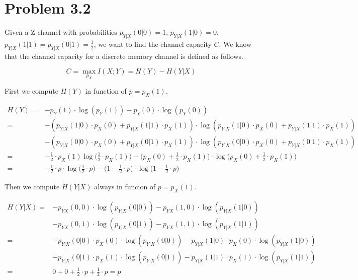 \section{Problem 3.2}

Given a Z channel with probabilities $p_{Y|X}(0|0)=1$, $p_{Y|X}(1|0)=0$, $p_{Y|X}(1|1)=p_{Y|X}(0|1)=\frac{1}{2}$, we want to find the channel capacity $C$. We know that the channel capacity for a discrete memory channel is defined as follows.

\begin{equation}
	C = \max_{p_X} I(X;Y) = H(Y)-H(Y|X)
\end{equation}

First we compute $H(Y)$ in function of $p=p_X(1)$.

\begin{equation}
\begin{aligned}
	H(Y)= & -p_Y(1)\cdot\log(p_Y(1))-p_Y(0)\cdot\log(p_Y(0)) \\
	= & -(p_{Y|X}(1|0) \cdot p_X(0) + p_{Y|X}(1|1) \cdot p_X(1)) \cdot\log(p_{Y|X}(1|0) \cdot p_X(0) + p_{Y|X}(1|1) \cdot p_X(1)) \\ & -(p_{Y|X}(0|0) \cdot p_X(0) + p_{Y|X}(0|1) \cdot p_X(1)) \cdot\log(p_{Y|X}(0|0) \cdot p_X(0) + p_{Y|X}(0|1) \cdot p_X(1)) \\
	= & -\frac{1}{2}\cdot p_X(1)\log\Big(\frac{1}{2}\cdot p_X(1)\Big)-\Big(p_X(0)+\frac{1}{2}\cdot p_X(1)\Big)\cdot \log \Big(p_X(0)+\frac{1}{2}\cdot p_X(1)\Big) \\
	= & -\frac{1}{2}\cdot p \cdot \log\Big(\frac{1}{2}\cdot p\Big)-\Big(1-\frac{1}{2}\cdot p\Big)\cdot \log \Big(1-\frac{1}{2}\cdot p\Big)
\end{aligned}
\end{equation}

Then we compute $H(Y|X)$ always in funcion of $p=p_X(1)$.

\begin{equation}
\begin{aligned}
	H(Y|X) = & -p_{YX}(0,0) \cdot \log (p_{Y|X}(0|0)) -p_{YX}(1,0) \cdot \log (p_{Y|X}(1|0)) \\
	& -p_{YX}(0,1) \cdot \log (p_{Y|X}(0|1)) -p_{YX}(1,1) \cdot \log (p_{Y|X}(1|1)) \\ =
	& -p_{Y|X}(0|0) \cdot p_X(0) \cdot \log (p_{Y|X}(0|0)) -p_{Y|X}(1|0) \cdot p_X(0) \cdot \log (p_{Y|X}(1|0)) \\
	& -p_{Y|X}(0|1) \cdot p_X(1) \cdot \log (p_{Y|X}(0|1)) -p_{Y|X}(1|1) \cdot p_X(1) \cdot \log (p_{Y|X}(1|1)) \\ =	& 0 + 0 + \frac{1}{2} \cdot p + \frac{1}{2} \cdot p = p
\end{aligned}
\end{equation}

